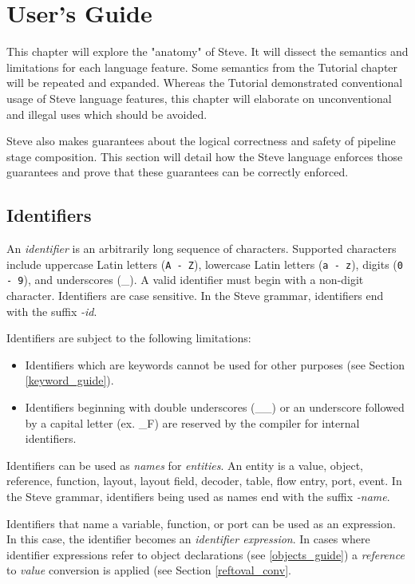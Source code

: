 \chapter{User's Guide} \label{users_guide}

This chapter will explore the "anatomy" of Steve. It will dissect the semantics and limitations for each language feature. Some semantics from the Tutorial chapter will be repeated and expanded. Whereas the Tutorial demonstrated conventional usage of Steve language features, this chapter will elaborate on unconventional and illegal uses which should be avoided.

Steve also makes guarantees about the logical correctness and safety of pipeline stage composition. This section will detail how the Steve language enforces those guarantees and prove that these guarantees can be correctly enforced.

\section{Identifiers} \label{identifiers_guide}

An \textit{identifier} is an arbitrarily long sequence of characters. Supported characters include uppercase Latin letters (\texttt{A - Z}), lowercase Latin letters (\texttt{a - z}), digits (\texttt{0 - 9}), and underscores (\_). A valid identifier must begin with a non-digit character. Identifiers are case sensitive. In the Steve grammar, identifiers end with the suffix \textit{-id}.

Identifiers are subject to the following limitations:

\begin{itemize}
\item Identifiers which are keywords cannot be used for other purposes (see Section \ref{keyword_guide}).

\item Identifiers beginning with double underscores (\_\_) or an underscore followed by a capital letter (ex. \_F) are reserved by the compiler for internal identifiers.
\end{itemize}

Identifiers can be used as \textit{names} for \textit{entities}. An entity is a value, object, reference, function, layout, layout field, decoder, table, flow entry, port, event. In the Steve grammar, identifiers being used as names end with the suffix \textit{-name}.

Identifiers that name a variable, function, or port can be used as an expression. In this case, the identifier becomes an \textit{identifier expression}. In cases where identifier expressions refer to object declarations (see \ref{objects_guide}) a \textit{reference} to \textit{value} conversion is applied (see Section \ref{reftoval_conv}.

